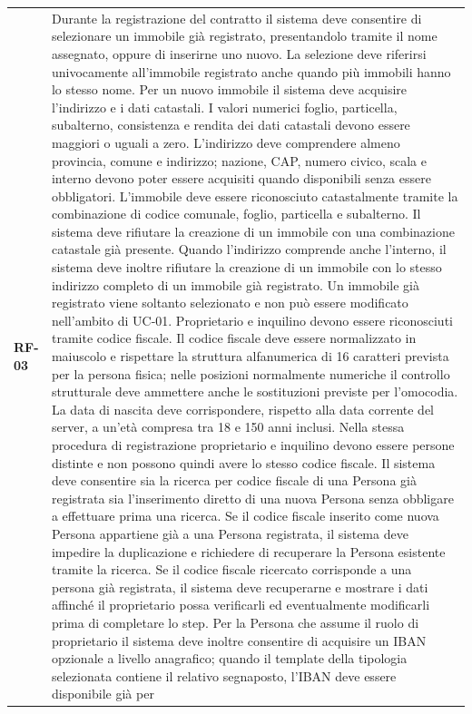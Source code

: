 \documentclass[12pt,a4paper]{article}
\newcommand{\req}[1]{\textbf{#1}}
\begin{document}
\begin{longtable}{>{\raggedright\arraybackslash}p{1.8cm}
                  >{\raggedright\arraybackslash}p{13cm}}
\req{RF-03} &
Durante la registrazione del contratto il sistema deve consentire di selezionare un immobile
già registrato, presentandolo tramite il nome assegnato, oppure di inserirne uno nuovo.
La selezione deve riferirsi univocamente all'immobile registrato anche quando più immobili
hanno lo stesso nome.
Per un nuovo immobile il sistema deve acquisire l'indirizzo e i dati catastali.
I valori numerici foglio, particella, subalterno, consistenza e rendita dei dati catastali
devono essere maggiori o uguali a zero.
L'indirizzo deve comprendere almeno provincia, comune e indirizzo; nazione, CAP, numero civico,
scala e interno devono poter essere acquisiti quando disponibili senza essere obbligatori.
L'immobile deve essere riconosciuto catastalmente tramite la combinazione di codice comunale,
foglio, particella e subalterno. Il sistema deve rifiutare la creazione di un immobile
con una combinazione catastale già presente.
Quando l'indirizzo comprende anche l'interno, il sistema deve inoltre rifiutare la creazione
di un immobile con lo stesso indirizzo completo di un immobile già registrato.
Un immobile già registrato viene soltanto selezionato e non può essere modificato nell'ambito di UC-01.
Proprietario e inquilino devono essere riconosciuti tramite codice fiscale.
Il codice fiscale deve essere normalizzato in maiuscolo e rispettare la struttura
alfanumerica di 16 caratteri prevista per la persona fisica; nelle posizioni normalmente
numeriche il controllo strutturale deve ammettere anche le sostituzioni previste per
l'omocodia. La data di nascita deve corrispondere, rispetto alla data corrente del server,
a un'età compresa tra 18 e 150 anni inclusi. Nella stessa procedura di registrazione
proprietario e inquilino devono essere persone distinte e non possono quindi avere lo
stesso codice fiscale.
Il sistema deve consentire sia la ricerca per codice fiscale di una Persona già registrata sia
l'inserimento diretto di una nuova Persona senza obbligare a effettuare prima una ricerca. Se il
codice fiscale inserito come nuova Persona appartiene già a una Persona registrata, il sistema
deve impedire la duplicazione e richiedere di recuperare la Persona esistente tramite la ricerca.
Se il codice fiscale ricercato corrisponde a una persona già registrata, il sistema deve recuperarne e
mostrare i dati affinché il proprietario possa verificarli ed eventualmente modificarli prima
di completare lo step. Per la Persona che assume il ruolo di proprietario il sistema deve
inoltre consentire di acquisire un IBAN opzionale a livello anagrafico; quando il template della
tipologia selezionata contiene il relativo segnaposto, l'IBAN deve essere disponibile già per

\end{longtable}
\end{document}
